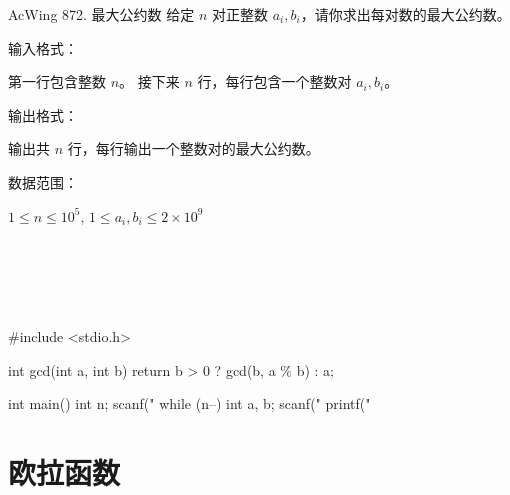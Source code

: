\begin{titledbox}{AcWing 872. 最大公约数}
    给定 $n$ 对正整数 $a_i, b_i$，请你求出每对数的最大公约数。

    输入格式：

    第一行包含整数 $n$。 接下来 $n$ 行，每行包含一个整数对 $a_i,b_i$。

    输出格式：

    输出共 $n$ 行，每行输出一个整数对的最大公约数。

    数据范围：

    $1 \le n \le 10^5$, $1 \le a_i, b_i \le 2 \times 10^9$

    \begin{inputblock}
         \\
         \\
    \end{inputblock}
    \begin{outputblock}
         \\
    \end{outputblock}
\end{titledbox}

\begin{mycpptwocol}[欧几里得算法]
    #include <stdio.h>

    int gcd(int a, int b) {
        return b > 0 ? gcd(b, a \% b) : a;
    }

    int main() {
        int n;
        scanf("%
        while (n--) {
            int a, b;
            scanf("%
            printf("%
        }
    }
\end{mycpptwocol}


\section{欧拉函数}

